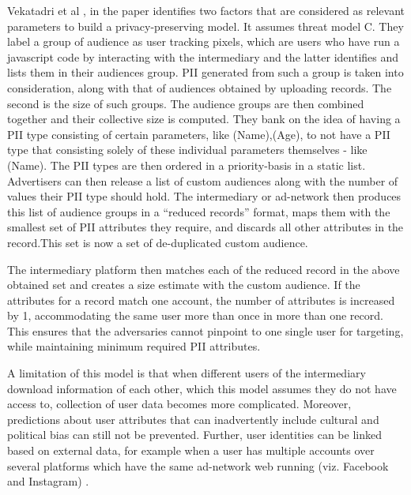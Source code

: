\documentclass[sigconf,nonacm]{acmart}
\begin{document}
Vekatadri et al \cite{privrisks}, in the paper identifies two factors that are considered as relevant parameters to build a privacy-preserving model. It assumes threat model C. They label a group of audience as user tracking pixels, which are users who have run a javascript code by interacting with the intermediary and the latter identifies and lists them in their audiences group. PII generated from such a group is taken into consideration, along with that of audiences obtained by uploading records. The second is the size of such groups. The audience groups are then combined together and their collective size is computed. They bank on the idea of having a PII type consisting of certain parameters, like {(Name),(Age)}, to not have a PII type that consisting solely of these individual parameters themselves - like {(Name)}. The PII types are then ordered in a priority-basis in a static list. Advertisers can then release a list of custom audiences along with the number of values their PII type should hold. The intermediary or ad-network then produces this list of audience groups in a “reduced records” format, maps them with the smallest set of PII attributes they require, and discards all other attributes in the record.This set is now a set of de-duplicated custom audience.

The intermediary platform then matches each of the reduced record in the above obtained set and creates a size estimate with the custom audience. If the attributes for a record match one account, the number of attributes is increased by 1, accommodating the same user more than once in more than one record. This ensures that the adversaries cannot pinpoint to one single user for targeting, while maintaining minimum required PII attributes.

A limitation of this model is that when different users of the intermediary download information of each other, which this model assumes they do not have access to, collection of user data becomes more complicated. Moreover, predictions about user attributes that can inadvertently include cultural and political bias can still not be prevented. Further, user identities can be linked based on external data, for example when a user has multiple accounts over several platforms which have the same ad-network web running (viz. Facebook and Instagram) \cite{facebookandgoogle}.
\end{document}
